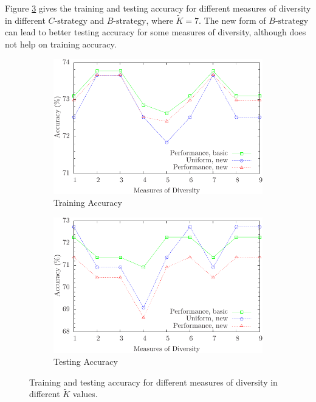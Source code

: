 Figure \ref{fig:diversity_0.7_others} gives the training and testing accuracy for different measures of diversity in different $C\text{-strategy}$ and $B\text{-strategy}$, where $\tilde{K}=7$. The new form of $B\text{-strategy}$ can lead to better testing accuracy for some measures of diversity, although does not help on training accuracy.


\begin{figure} [t]
\centering
\begin{subfigure}{.45\textwidth}
  \centering
  \includegraphics[width=.95\linewidth]{../Figure/diversity_7_others_train}
  \caption{Training Accuracy}
  \label{fig:diversity_0.7_others_train}
\end{subfigure}%
\begin{subfigure}{.45\textwidth}
  \centering
  \includegraphics[width=.95\linewidth]{../Figure/diversity_7_others_test}
  \caption{Testing Accuracy}
  \label{fig:diversity_0.7_others_test}
\end{subfigure}
\caption{Training and testing accuracy for different measures of diversity in different $\tilde{K}$ values.}
\label{fig:diversity_0.7_others}
\end{figure}


